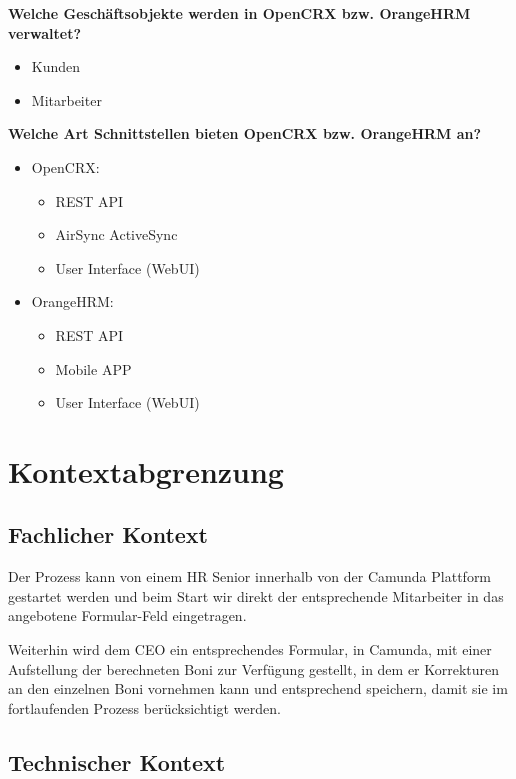\documentclass[]{article}
\begin{document}
\textbf{Welche Geschäftsobjekte werden in OpenCRX bzw. OrangeHRM verwaltet?}
\begin{itemize}
	\item Kunden
	\item Mitarbeiter
\end{itemize}
\textbf{Welche Art Schnittstellen bieten OpenCRX bzw. OrangeHRM an?}
	\begin{itemize}
	\item OpenCRX:
	\begin{itemize}
		\item REST API
		\item AirSync ActiveSync
		\item User Interface (WebUI)
	\end{itemize}
	\item OrangeHRM:
		\begin{itemize}
			\item REST API
			\item Mobile APP
			\item User Interface (WebUI)
		\end{itemize}
\end{itemize}


\hypertarget{section-system-scope-and-context}{%
\section{Kontextabgrenzung}\label{section-system-scope-and-context}}

\hypertarget{_fachlicher_kontext}{%
\subsection{Fachlicher Kontext}\label{_fachlicher_kontext}}

Der Prozess kann von einem HR Senior innerhalb von der Camunda Plattform gestartet werden und beim Start wir direkt der entsprechende Mitarbeiter in das angebotene Formular-Feld eingetragen.

Weiterhin wird dem CEO ein entsprechendes Formular, in Camunda, mit einer Aufstellung der berechneten Boni zur Verfügung gestellt, in dem er Korrekturen an den einzelnen Boni vornehmen kann und entsprechend speichern, damit sie im fortlaufenden Prozess berücksichtigt werden.

\hypertarget{_technischer_kontext}{%
\subsection{Technischer Kontext}\label{_technischer_kontext}}
\end{document}
